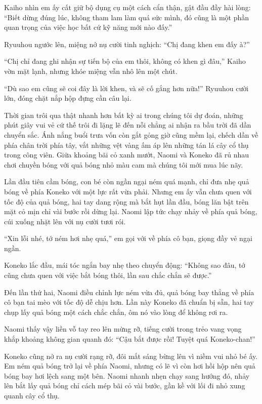 ﻿\documentclass[../main.tex]{subfiles}
\begin{document}
Kaiho nhìn em ấy cất giữ bộ dụng cụ một cách cẩn thận, gật đầu đầy hài lòng: ``Biết dừng đúng lúc, không tham lam làm quá sức mình, đó cũng là một phần quan trọng của việc học bất cứ kỹ năng mới nào đấy.''

Ryuuhou ngước lên, miệng nở nụ cười tinh nghịch: ``Chị đang khen em đấy à?''

``Chị chỉ đang ghi nhận sự tiến bộ của em thôi, không có khen gì đâu,'' Kaiho vờn mặt lạnh, nhưng khóe miệng vẫn nhô lên một chút.

``Dù sao em cũng sẽ coi đây là lời khen, và sẽ cố gắng hơn nữa!'' Ryuuhou cười lớn, đóng chặt nắp hộp đựng cần câu lại.

\ct

Thời gian trôi qua thật nhanh hơn bất kỳ ai trong chúng tôi dự đoán, những phút giây vui vẻ cứ thế trôi đi lặng lẽ đến nỗi chẳng ai nhận ra bầu trời đã dần chuyển sắc. Ánh nắng buổi trưa vốn còn gắt gỏng giờ cũng mềm lại, chếch dần về phía chân trời phía tây, vắt những vệt vàng ấm áp lên những tán lá cây cổ thụ trong công viên. Giữa khoảng bãi cỏ xanh mướt, Naomi và Koneko đã rủ nhau chơi chuyền bóng với quả bóng nhỏ màu cam mà chúng tôi mới mua lúc nãy.

Lần đầu tiên cầm bóng, con bé còn ngần ngại ném quá mạnh, chỉ đưa nhẹ quả bóng về phía Koneko với một lực rất vừa phải. Nhưng em ấy vẫn chưa quen với tốc độ của quả bóng, hai tay dang rộng mà bắt hụt lần đầu, bóng lăn bật trên mặt cỏ mịn chỉ vài bước rồi dừng lại. Naomi lập tức chạy nhảy về phía quả bóng, cúi xuống nhặt lên với nụ cười tươi rói.

``Xin lỗi nhé, tớ ném hơi nhẹ quá,'' em gọi với về phía cô bạn, giọng đầy vẻ ngại ngần.

Koneko lắc đầu, mái tóc ngắn bay nhẹ theo chuyển động: ``Không sao đâu, tớ cũng chưa quen với việc bắt bóng thôi, lần sau chắc chắn sẽ được.''

Đến lần thứ hai, Naomi điều chỉnh lực ném vừa đủ, quả bóng bay thẳng về phía cô bạn tai mèo với tốc độ dễ chịu hơn. Lần này Koneko đã chuẩn bị sẵn, hai tay chụp lấy quả bóng một cách chắc chắn, ôm nó vào lòng để không rơi ra.

Naomi thấy vậy liền vỗ tay reo lên mừng rỡ, tiếng cười trong trẻo vang vọng khắp khoảng không gian quanh đó: ``Cậu bắt được rồi! Tuyệt quá Koneko-chan!''

Koneko cũng nở ra nụ cười rạng rỡ, đôi mắt sáng bừng lên vì niềm vui nhỏ bé ấy. Em ném quả bóng trở lại về phía Naomi, nhưng có lẽ vì còn hơi hồi hộp nên quả bóng bay hơi lệch sang một bên. Naomi nhanh nhẹn chạy sang hướng đó, nhảy lên bắt lấy quả bóng chỉ cách mép bãi cỏ vài bước, gần kề với lối đi nhỏ xung quanh cây cổ thụ.
\end{document}
